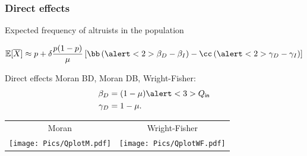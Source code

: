 \documentclass[]{beamer}
\begin{document}
\subsubsection{Direct effects}
\begin{frame}{Expected frequency of altruists in the population}

\vspace{-1em}
\begin{displaymath}
\mathbb{E}[\overline{X}] \approx p + \delta \frac{p (1-p)}{\mu}  \left[ \bb \left( \alert<2>{\beta_D} - \beta_I \right) - \cc \left( \alert<2>{\gamma_D} - \gamma_I \right) \right]
\end{displaymath}

\pause
\begin{block}{Direct effects}
Moran BD, Moran DB, Wright-Fisher:
\begin{align*}
\beta_D & = (1-\mu) \alert<3>{Q_{\mathsf{in}}} \\
\gamma_D & = 1-\mu.
\end{align*}

\vspace{-1.5em}

\pause
\begin{center}
\small
\begin{tabular}{cc}
Moran & Wright-Fisher \vspace{-0.5em} \\ 
\texttt{[image: Pics/QplotM.pdf]}
&
\texttt{[image: Pics/QplotWF.pdf]}
\end{tabular}
\end{center}
\end{block}
\end{frame}
\end{document}
